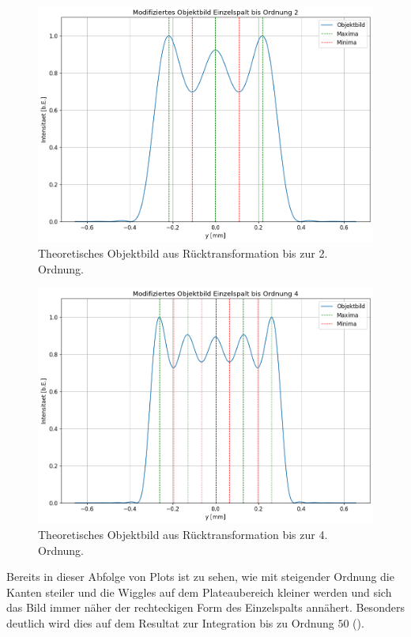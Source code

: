 \begin{figure}[H]
  \centering
  \includegraphics[width=.9\textwidth]{files/plots/4/es_theorie_objektbild_ord2.png}
  \caption{Theoretisches Objektbild aus Rücktransformation bis zur 2. Ordnung.}
  \label{fig:es_theorie_objektbild_ord2}
\end{figure}

\begin{figure}[H]
  \centering
  \includegraphics[width=.9\textwidth]{files/plots/4/es_theorie_objektbild_ord4.png}
  \caption{Theoretisches Objektbild aus Rücktransformation bis zur 4. Ordnung.}
  \label{fig:es_theorie_objektbild_ord4}
\end{figure}

Bereits in dieser Abfolge von Plots ist zu sehen, wie mit steigender Ordnung die Kanten steiler und die \glqq{}Wiggles\grqq{} auf dem Plateaubereich kleiner werden und sich das Bild immer näher der rechteckigen Form des Einzelspalts annähert. Besonders deutlich wird dies auf dem Resultat zur Integration bis zu Ordnung $50$ (). 

